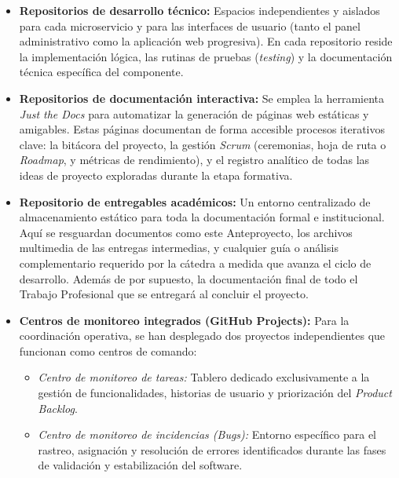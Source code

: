 \begin{itemize}
    \item \textbf{Repositorios de desarrollo técnico:} Espacios independientes y aislados para cada microservicio y para las interfaces de usuario (tanto el panel administrativo como la aplicación web progresiva). En cada repositorio reside la implementación lógica, las rutinas de pruebas (\textit{testing}) y la documentación técnica específica del componente.
    \item \textbf{Repositorios de documentación interactiva:} Se emplea la herramienta \textit{Just the Docs} para automatizar la generación de páginas web estáticas y amigables. Estas páginas documentan de forma accesible procesos iterativos clave: la bitácora del proyecto, la gestión \textit{Scrum} (ceremonias, hoja de ruta o \textit{Roadmap}, y métricas de rendimiento), y el registro analítico de todas las ideas de proyecto exploradas durante la etapa formativa.
    \item \textbf{Repositorio de entregables académicos:} Un entorno centralizado de almacenamiento estático para toda la documentación formal e institucional. Aquí se resguardan documentos como este Anteproyecto, los archivos multimedia de las entregas intermedias, y cualquier guía o análisis complementario requerido por la cátedra a medida que avanza el ciclo de desarrollo. Además de por supuesto, la documentación final de todo el Trabajo Profesional que se entregará al concluir el proyecto.
    \item \textbf{Centros de monitoreo integrados (GitHub Projects):} Para la coordinación operativa, se han desplegado dos proyectos independientes que funcionan como centros de comando:
    \begin{itemize}
        \item \textit{Centro de monitoreo de tareas:} Tablero dedicado exclusivamente a la gestión de funcionalidades, historias de usuario y priorización del \textit{Product Backlog}.
        \item \textit{Centro de monitoreo de incidencias (\textit{Bugs}):} Entorno específico para el rastreo, asignación y resolución de errores identificados durante las fases de validación y estabilización del software.
    \end{itemize}
\end{itemize}
